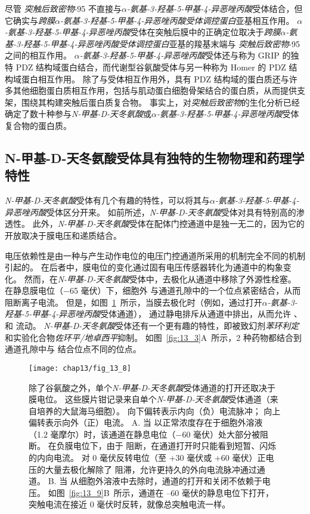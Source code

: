 尽管 \textit{突触后致密物}-95 不直接与\textit{$\alpha$-氨基-3-羟基-5-甲基-4-异恶唑丙酸}受体结合，但它确实与\textit{跨膜$\alpha$-氨基-3-羟基-5-甲基-4-异恶唑丙酸受体调控蛋白}亚基相互作用。
\textit{$\alpha$-氨基-3-羟基-5-甲基-4-异恶唑丙酸}受体在突触后膜中的正确定位取决于\textit{跨膜$\alpha$-氨基-3-羟基-5-甲基-4-异恶唑丙酸受体调控蛋白}亚基的羧基末端与 \textit{突触后致密物}-95 之间的相互作用。
\textit{$\alpha$-氨基-3-羟基-5-甲基-4-异恶唑丙酸}受体还与称为 GRIP 的独特 PDZ 结构域蛋白结合，而代谢型谷氨酸受体与另一种称为 Homer 的 PDZ 结构域蛋白相互作用。
除了与受体相互作用外，具有 PDZ 结构域的蛋白质还与许多其他细胞蛋白质相互作用，包括与肌动蛋白细胞骨架结合的蛋白质，从而提供支架，围绕其构建突触后蛋白质复合物。
事实上，对\textit{突触后致密物}的生化分析已经确定了数十种参与\textit{N-甲基-D-天冬氨酸}或\textit{$\alpha$-氨基-3-羟基-5-甲基-4-异恶唑丙酸}受体复合物的蛋白质。



\subsection{N-甲基-D-天冬氨酸受体具有独特的生物物理和药理学特性}

\textit{N-甲基-D-天冬氨酸}受体有几个有趣的特性，可以将其与\textit{$\alpha$-氨基-3-羟基-5-甲基-4-异恶唑丙酸}受体区分开来。
如前所述，\textit{N-甲基-D-天冬氨酸}受体对具有特别高的渗透性。
此外，\textit{N-甲基-D-天冬氨酸}受体在配体门控通道中是独一无二的，因为它的开放取决于膜电压和递质结合。


电压依赖性是由一种与产生动作电位的电压门控通道所采用的机制完全不同的机制引起的。
在后者中，膜电位的变化通过固有电压传感器转化为通道中的构象变化。
然而，在\textit{N-甲基-D-天冬氨酸}受体中，去极化从通道中移除了外源性栓塞。
在静息膜电位（−65 毫伏）下，细胞外  与通道孔隙中的一个位点紧密结合，从而阻断离子电流。
但是，如图~\ref{fig:13_8}~所示，当膜去极化时（例如，通过打开\textit{$\alpha$-氨基-3-羟基-5-甲基-4-异恶唑丙酸}受体通道）， 通过静电排斥从通道中排出，从而允许 、 和  流动。 
\textit{N-甲基-D-天冬氨酸}受体还有一个更有趣的特性，即被致幻剂\textit{苯环利定}和实验化合物\textit{佐环平/地卓西平}抑制。
如图~\ref{fig:13_3}A~所示，2 种药物都结合到通道孔隙中与  结合位点不同的位点。


\begin{figure}[htbp]
	\centering
	\texttt{[image: chap13/fig\_13\_8]}
	\caption{除了谷氨酸之外，单个\textit{N-甲基-D-天冬氨酸}受体通道的打开还取决于膜电位。
		这些膜片钳记录来自单个\textit{N-甲基-D-天冬氨酸}受体通道（来自培养的大鼠海马细胞）。
		向下偏转表示内向（负）电流脉冲；
		向上偏转表示向外（正）电流。
		A. 当  以正常浓度存在于细胞外溶液（1.2 毫摩尔）时，该通道在静息电位（−60 毫伏）处大部分被阻断。
		在负膜电位下，由于  阻断，在通道打开时只能看到短暂、闪烁的内向电流。
		对 0 毫伏反转电位（至 +30 毫伏或 +60 毫伏）正电压的大量去极化解除了  阻滞，允许更持久的外向电流脉冲通过通道。
		B. 当  从细胞外溶液中去除时，通道的打开和关闭不依赖于电压。
		如图~\ref{fig:13_9}B~所示，通道在 –60 毫伏的静息电位下打开，突触电流在接近 0 毫伏时反转，就像总突触电流一样。}
	\label{fig:13_8}
\end{figure}


